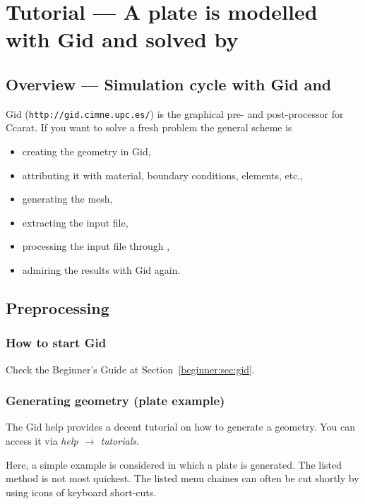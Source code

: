\chapter{Tutorial --- A plate is modelled with Gid and solved by
  \ccarat{}}
\label{tut_struct:chap}

\section{Overview --- Simulation cycle with Gid and \ccarat{}}

Gid (\texttt{http://gid.cimne.upc.es/}) is the graphical pre- and
post-processor for Ccarat\@. If you want to solve a fresh problem
the general scheme is 

\begin{itemize}
\item creating the geometry in Gid, 
\item attributing it with material, boundary conditions, elements, etc., 
\item generating the mesh, 
\item extracting the \ccarat{} input file, 
\item processing the input file through \ccarat{}, 
\item admiring the results with Gid again. 
\end{itemize}


\section{Preprocessing}\label{tut_struct:sec:preprocessing}


\subsection{How to start Gid}

Check the Beginner's Guide at Section~\ref{beginner:sec:gid}.


\subsection{Generating geometry (plate example)}

The Gid help provides a decent tutorial on how to generate a geometry.
You can access it via \emph{help $\rightarrow$ tutorials}.

Here, a simple example is considered in which a plate is generated.
The listed method is not most quickest. The listed menu chaines can
often be cut shortly by using icons of keyboard short-cuts. 

